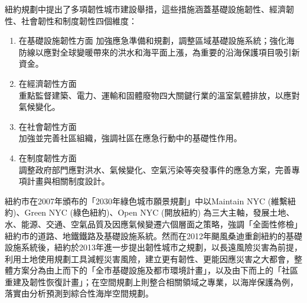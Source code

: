 \documentclass[a4paper,12pt]{article}
\begin{document}
紐約規劃中提出了多項韌性城市建設舉措，這些措施涵蓋基礎設施韌性、經濟韌性、社會韌性和制度韌性四個維度：\\
\begin{enumerate}
\item 在基礎設施韌性方面 加強應急準備和規劃，調整區域基礎設施系統；強化海防線以應對全球變暖帶來的洪水和海平面上漲，為重要的沿海保護項目吸引新資金。\\
\item 在經濟韌性方面\\
重點監督建築、電力、運輸和固體廢物四大關鍵行業的溫室氣體排放，以應對氣候變化。\\
\item 在社會韌性方面\\
加強並完善社區組織，強調社區在應急行動中的基礎性作用。\\
\item 在制度韌性方面\\
調整政府部門應對洪水、氣候變化、空氣污染等突發事件的應急方案，完善專項計畫與相關制度設計。\\
\end{enumerate}

紐約市在2007年頒布的「2030年綠色城市願景規劃」中以Maintain NYC (維繫紐約)、Green NYC (綠色紐約)、Open NYC (開放紐約) 為三大主軸，發展土地、水、能源、交通、空氣品質及因應氣候變遷六個層面之策略，強調「全面性修檢」紐約市的道路、地鐵鐵路及基礎設施系統。然而在2012年颶風桑迪重創紐約的基礎設施系統後，紐約於2013年進⼀步提出韌性城市之規劃，以⻑遠風險災害為前提，利用土地使用規劃工具減輕災害風險，建立更有韌性、更能因應災害之大都會，整體方案分為由上而下的「全市基礎設施及都市環境計畫」，以及由下而上的「社區重建及韌性恢復計畫」；在空間規劃上則整合相關領域之專業，以海岸保護為例，落實由分析預測到綜合性海岸空間規劃。\\
\end{document}
